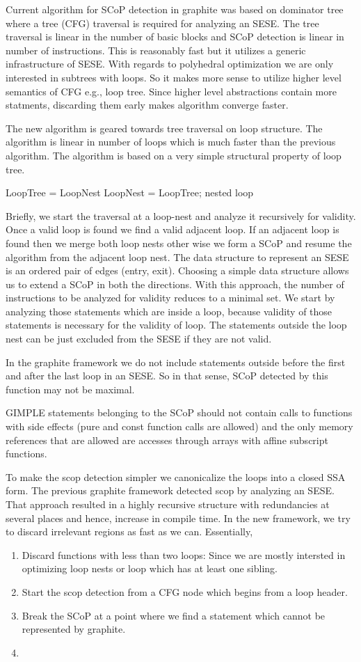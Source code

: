\documentclass{sigplanconf}
\begin{document}
Current algorithm for SCoP detection in graphite was based on dominator tree where a tree (CFG) traversal is required
for analyzing an SESE. The tree traversal is linear in the number of basic blocks and SCoP detection is linear in
number of instructions. This is reasonably fast but it utilizes a generic infrastructure of SESE. With regards to
polyhedral optimization we are only interested in subtrees with loops. So it makes more sense to utilize higher level
semantics of CFG e.g., loop tree. Since higher level abstractions contain more statments, discarding them early
makes algorithm converge faster.

The new algorithm is geared towards tree traversal on loop structure. The algorithm is linear in number of loops
which is much faster than the previous algorithm. The algorithm is based on a very simple structural property of loop
tree.

LoopTree = LoopNest
LoopNest = LoopTree; nested loop

Briefly, we start the traversal at a loop-nest and analyze it recursively for validity. Once a valid loop is
found we find a valid adjacent loop. If an adjacent loop is found then we merge both loop nests
other wise we form a SCoP and resume the algorithm from the adjacent loop nest. The data structure to represent an SESE
is an ordered pair of edges (entry, exit). Choosing a simple data structure allows us to extend a SCoP in both the
directions. With this approach, the number of instructions to be analyzed for validity reduces to a minimal set.
We start by analyzing those statements which are inside a loop, because validity of those statements is
necessary for the validity of loop. The statements outside the loop nest can be just excluded from the
SESE if they are not valid.

In the graphite framework we do not include statements outside before the first and after the last loop in an SESE.
So in that sense, SCoP detected by this function may not be maximal.

GIMPLE statements belonging to the SCoP should not contain calls to functions with
side effects (pure and const function calls are allowed) and the only memory references
that are allowed are accesses through arrays with affine subscript functions.

To make the scop detection simpler we canonicalize the loops into a closed SSA form.
The previous graphite framework detected scop by analyzing an SESE. That approach resulted in a highly recursive structure
with redundancies at several places and hence, increase in compile time. In the new framework, we try to discard irrelevant
regions as fast as we can. Essentially,
\begin{enumerate}
\item Discard functions with less than two loops: Since we are mostly intersted in optimizing loop nests
or loop which has at least one sibling.
\item Start the scop detection from a CFG node which begins from a loop header.
\item Break the SCoP at a point where we find a statement which cannot be represented by graphite.
\item 
\end{enumerate}
\end{document}
